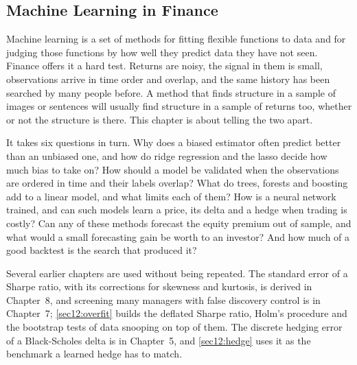 
\begin{chapterrefs}
\setcounter{chapter}{11}
\chapter{Machine Learning in Finance}
\label{ch:ml}

Machine learning is a set of methods for fitting flexible functions to data and for judging those
functions by how well they predict data they have not seen. Finance offers it a hard test. Returns are
noisy, the signal in them is small, observations arrive in time order and overlap, and the same history
has been searched by many people before. A method that finds structure in a sample of images or
sentences will usually find structure in a sample of returns too, whether or not the structure is
there. This chapter is about telling the two apart.

It takes six questions in turn. Why does a biased estimator often predict better than an unbiased one,
and how do ridge regression and the lasso decide how much bias to take on? How should a model be validated when the
observations are ordered in time and their labels overlap? What do trees, forests and boosting add to
a linear model, and what limits each of them? How is a neural network trained, and can such models learn
a price, its delta and a hedge when trading is costly? Can any of these methods forecast the equity premium out of
sample, and what would a small forecasting gain be worth to an investor? And how much of a good
backtest is the search that produced it?

Several earlier chapters are used without being repeated. The standard error of a Sharpe ratio, with
its corrections for skewness and kurtosis, is derived in Chapter~8, and screening many managers with
false discovery control is in Chapter~7; \cref{sec12:overfit} builds the deflated Sharpe ratio,
Holm's procedure and the bootstrap tests of data snooping on top of them. The discrete hedging error of a Black-Scholes delta is in Chapter~5,
and \cref{sec12:hedge} uses it as the benchmark a learned hedge has to match.


\end{chapterrefs}
